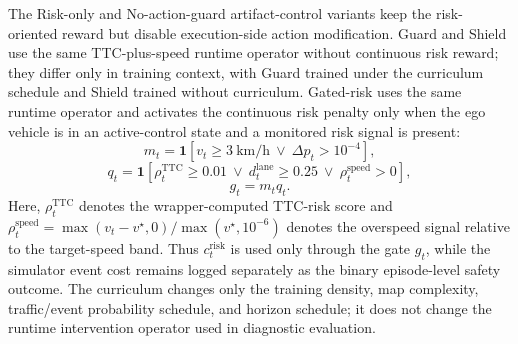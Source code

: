 \documentclass[pdflatex,sn-mathphys-ay]{sn-jnl}
\begin{document}
The Risk-only and No-action-guard artifact-control variants keep the risk-oriented reward but disable execution-side action modification. Guard and Shield use the same TTC-plus-speed runtime operator without continuous risk reward; they differ only in training context, with Guard trained under the curriculum schedule and Shield trained without curriculum. Gated-risk uses the same runtime operator and activates the continuous risk penalty only when the ego vehicle is in an active-control state and a monitored risk signal is present:
\begin{equation}
m_t=\mathbf{1}\left[v_t\geq 3\ \mathrm{km/h}\ \lor\ \Delta p_t>10^{-4}\right],
\end{equation}
\begin{equation}
q_t=\mathbf{1}\left[\rho_t^{\mathrm{TTC}}\geq0.01\ \lor\ d_t^{\mathrm{lane}}\geq0.25\ \lor\ \rho_t^{\mathrm{speed}}>0\right],
\end{equation}
\begin{equation}
g_t=m_t q_t.
\end{equation}
Here, $\rho_t^{\mathrm{TTC}}$ denotes the wrapper-computed TTC-risk score and $\rho_t^{\mathrm{speed}}=\max(v_t-v^\star,0)/\max(v^\star,10^{-6})$ denotes the overspeed signal relative to the target-speed band. Thus $c_t^{\mathrm{risk}}$ is used only through the gate $g_t$, while the simulator event cost remains logged separately as the binary episode-level safety outcome. The curriculum changes only the training density, map complexity, traffic/event probability schedule, and horizon schedule; it does not change the runtime intervention operator used in diagnostic evaluation.
\end{document}
